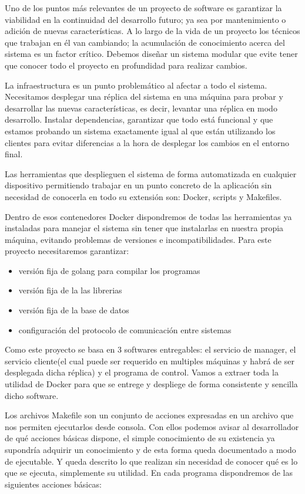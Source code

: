 
Uno de los puntos más relevantes de un proyecto de software es garantizar la viabilidad en la continuidad del desarrollo futuro;
ya sea por mantenimiento o adición de nuevas características.
A lo largo de la vida de un proyecto los técnicos que trabajan en él van cambiando;
la acumulación de conocimiento acerca del sistema es un factor crítico.
Debemos diseñar un sistema modular que evite tener que conocer todo el proyecto en profundidad para realizar cambios.

La infraestructura es un punto problemático al afectar a todo el sistema.
Necesitamos desplegar una réplica del sistema en una máquina para probar y desarrollar las nuevas características, es decir, levantar una réplica en modo desarrollo.
Instalar dependencias, garantizar que todo está funcional y que estamos probando un sistema exactamente igual al que están utilizando los clientes para evitar diferencias a la hora de desplegar los cambios en el entorno final.

Las herramientas que desplieguen el sistema de forma automatizada en cualquier dispositivo permitiendo trabajar en un punto concreto de la aplicación sin necesidad de conocerla en todo su extensión son: Docker, scripts y Makefiles.

Dentro de esos contenedores Docker dispondremos de todas las herramientas ya instaladas para manejar el sistema sin tener que instalarlas en nuestra propia máquina, evitando problemas de versiones e incompatibilidades.
Para este proyecto necesitaremos garantizar:

\begin{itemize}
    \item versión fija de golang para compilar los programas
    \item versión fija de la las librerias
    \item versión fija de la base de datos
    \item configuración del protocolo de comunicación entre sistemas
\end{itemize}

Como este proyecto se basa en 3 softwares entregables: el servicio de manager, el servicio cliente(el cual puede ser requerido en multiples máquinas y habrá de ser desplegada dicha réplica) y el programa de control. Vamos a extraer toda la utilidad de Docker para que se entrege y despliege de forma consistente y sencilla dicho software.

Los archivos Makefile son un conjunto de acciones expresadas en un archivo que nos permiten ejecutarlos desde consola. Con ellos podemos avisar al desarrollador de qué acciones básicas dispone, el simple conocimiento de su existencia ya supondría adquirir un conocimiento y de esta forma queda documentado a modo de ejecutable. Y queda descrito lo que realizan sin necesidad de conocer qué es lo que se ejecuta, simplemente su utilidad. En cada programa dispondremos de las siguientes acciones básicas:

